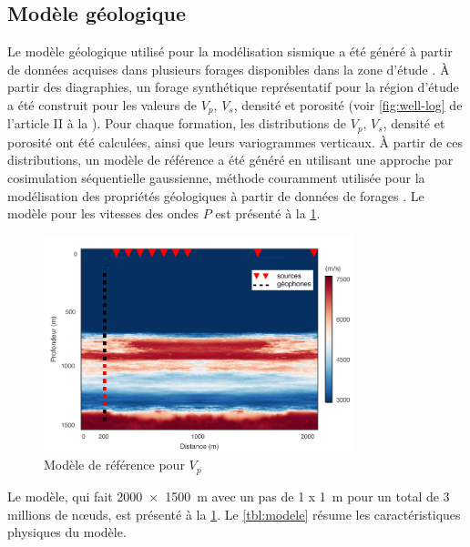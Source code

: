 \subsection{Modèle géologique}
Le modèle géologique utilisé pour la modélisation sismique a été généré à partir
de données acquises dans plusieurs forages disponibles dans la zone d'étude
\citep{Claprood2012,TranNgoc2014}. À partir des diagraphies, un forage
synthétique représentatif pour la région d'étude a été construit pour les valeurs de $V_p$,
$V_s$, densité et porosité (voir \cref{fig:well-log} de l'article II à la
). Pour chaque formation, les distributions de $V_p$,
$V_s$, densité et porosité ont été calculées, ainsi que leurs variogrammes
verticaux. À partir de ces distributions, un modèle de référence a été généré en
utilisant une approche par cosimulation séquentielle gaussienne,
méthode couramment utilisée pour la modélisation des propriétés géologiques à
partir de données de forages \citep{Deutsch1998,Doyen2007}. Le modèle pour les vitesses
des ondes $P$ est présenté à la \cref{fig:mod_ref_vp}.
\begin{figure}[ht]
\centering
\includegraphics[width=0.8\textwidth]{fig/mod_ref_vp.pdf}
\caption{Modèle de référence pour $V_p$}
\label{fig:mod_ref_vp}
\end{figure}
Le modèle, qui fait \SI{2000 x 1500}{\metre} avec un pas de \SI{1 x
1}{\metre} pour un total de \num{3} millions de nœuds, est présenté à la
\cref{fig:mod_ref_vp}. Le \cref{tbl:modele} résume les caractéristiques
physiques du modèle.
